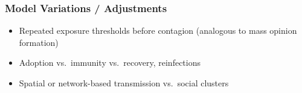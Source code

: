 \documentclass[
  12pt,
]{article}
\providecommand{\tightlist}{%
  \setlength{\itemsep}{0pt}\setlength{\parskip}{0pt}}
\numberwithin{equation}{section}
\numberwithin{table}{section}
\numberwithin{figure}{section}
\begin{document}
\hypertarget{model-variations-adjustments}{%
\subsubsection{Model Variations /
Adjustments}\label{model-variations-adjustments}}

\begin{itemize}
\tightlist
\item
  Repeated exposure thresholds before contagion (analogous to mass
  opinion formation)
\item
  Adoption vs.~immunity vs.~recovery, reinfections
\item
  Spatial or network-based transmission vs.~social clusters
\end{itemize}

\footnotesize

  
\end{document}
